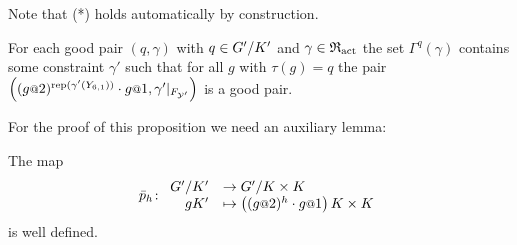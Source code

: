 \documentclass[a4paper,11pt]{amsart}
\begin{document}
Note that (*) holds automatically by construction.
\begin{pro}\label{pro:existsNextPair}
 For each good pair $(q,\gamma)$ with $q\in{G'/K'}$ and $\gamma\in\mathfrak{R}_{\operatorname{act}}$ the set $\Gamma^q(\gamma)$ 
 contains some constraint $\gamma'$ such that for all $g$ with $\tau(g)=q$ the
 pair $\left((g\at{2})^{\rep(\gamma'(Y_{6,1}))}\cdot g\at{1},\gamma'|_{F_{
 \mathcal{Y}'}}\right)$ is a good pair.
\end{pro}

\noindent For the proof of this proposition we need an auxiliary lemma:
%
%  
\begin{lem} \label{lem:pIsDefinedModK'}
 The map 
 \[\bar p_h\colon\begin{array}{rl} \RNK{G'}{K'} &\to \RNK{G'}{K\times K}\\
  gK'&\mapsto \left((g\at{2})^h\cdot g\at{1}\right){K\times K}
 \end{array}\]
is well defined.
\end{lem}
\end{document}

